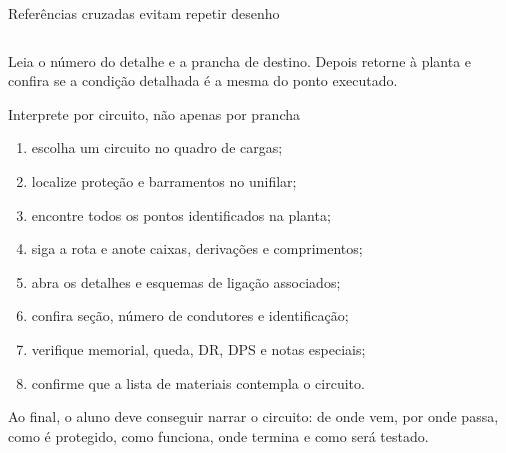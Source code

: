 \begin{frame}{Referências cruzadas evitam repetir desenho}
\small
\begin{columns}[T,onlytextwidth]
\end{columns}
\begin{caixaObs}
Leia o número do detalhe e a prancha de destino. Depois retorne à planta e confira se a condição detalhada é a mesma do ponto executado.
\end{caixaObs}
\end{frame}

\begin{frame}{Interprete por circuito, não apenas por prancha}
\small
\begin{enumerate}
\item escolha um circuito no quadro de cargas;
\item localize proteção e barramentos no unifilar;
\item encontre todos os pontos identificados na planta;
\item siga a rota e anote caixas, derivações e comprimentos;
\item abra os detalhes e esquemas de ligação associados;
\item confira seção, número de condutores e identificação;
\item verifique memorial, queda, DR, DPS e notas especiais;
\item confirme que a lista de materiais contempla o circuito.
\end{enumerate}
\begin{caixaProjeto}
Ao final, o aluno deve conseguir narrar o circuito: de onde vem, por onde passa, como é protegido, como funciona, onde termina e como será testado.
\end{caixaProjeto}
\end{frame}


